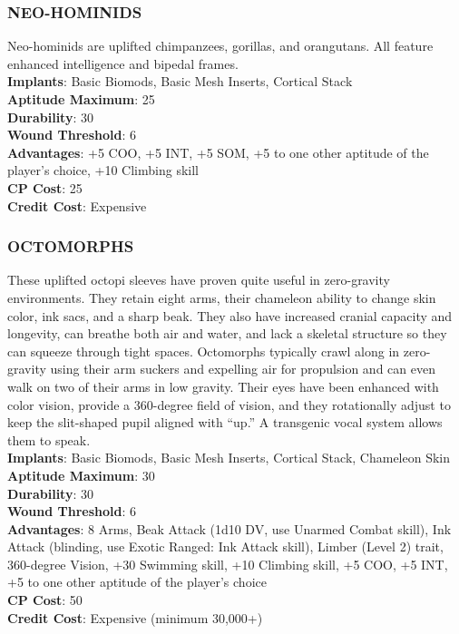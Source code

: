 \subsubsection{NEO-HOMINIDS}
Neo-hominids are uplifted chimpanzees, gorillas, and
orangutans. All feature enhanced intelligence and
bipedal frames.
\\ \textbf{Implants}: Basic Biomods, Basic Mesh Inserts,
Cortical Stack
\\ \textbf{Aptitude Maximum}: 25
\\ \textbf{Durability}: 30
\\ \textbf{Wound Threshold}: 6
\\ \textbf{Advantages}: +5 COO, +5 INT, +5 SOM, +5 to one other
aptitude of the player’s choice, +10 Climbing skill
\\ \textbf{CP Cost}: 25
\\ \textbf{Credit Cost}: Expensive

\subsubsection{OCTOMORPHS}
These uplifted octopi sleeves have proven quite useful
in zero-gravity environments. They retain eight arms,
their chameleon ability to change skin
color, ink sacs, and a sharp beak. They also
have increased cranial capacity and longevity, can breathe both air and water, and lack a skeletal structure so they can squeeze through tight
spaces. Octomorphs typically crawl along in zero-
gravity using their arm suckers and expelling air for
propulsion and can even walk on two of their arms
in low gravity. Their eyes have been enhanced with
color vision, provide a 360-degree field of vision, and
they rotationally adjust to keep the slit-shaped pupil
aligned with “up.” A transgenic vocal system allows
them to speak.
\\ \textbf{Implants}: Basic Biomods, Basic Mesh Inserts, Cortical
Stack, Chameleon Skin
\\ \textbf{Aptitude Maximum}: 30
\\ \textbf{Durability}: 30
\\ \textbf{Wound Threshold}: 6
\\ \textbf{Advantages}: 8 Arms, Beak Attack (1d10 DV, use
Unarmed Combat skill), Ink Attack (blinding, use
Exotic Ranged: Ink Attack skill), Limber (Level 2)
trait, 360-degree Vision, +30 Swimming skill, +10
Climbing skill, +5 COO, +5 INT, +5 to one other
aptitude of the player’s choice
\\ \textbf{CP Cost}: 50
\\ \textbf{Credit Cost}: Expensive (minimum 30,000+)


